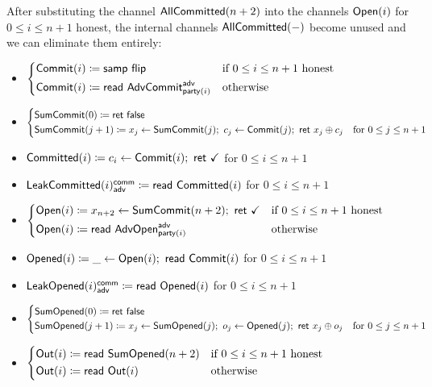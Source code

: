 \noindent After substituting the channel $\mathsf{AllCommitted}(n+2)$ into the channels $\mathsf{Open}(i)$ for $0 \leq i \leq n+1$ honest, the internal channels $\mathsf{AllCommitted}(-)$ become unused and we can eliminate them entirely:

\begin{itemize}
\item {\color{blue} $\begin{cases*} \Commit(i) \coloneqq \samp{\flip} & \text{if $0 \leq i \leq n+1$ honest} \\ \Commit(i) \coloneqq \read{\AdvCommit^\adv_{\party(i)}} & \text{otherwise} \end{cases*}$}
\item {\color{blue} $\begin{cases*} \SumCommit(0) \coloneqq \ret{\false} & \\ \SumCommit(j+1) \coloneqq x_j \leftarrow \SumCommit(j); \ c_j \leftarrow \Commit(j); \ \ret{x_j \oplus c_j} & \text{for $0 \leq j \leq n+1$} \end{cases*}$}
\item {\color{magenta} $\mathsf{Committed}(i) \coloneqq c_i \leftarrow \mathsf{Commit}(i); \ \mathsf{ret} \ \checkmark$ for $0 \leq i \leq n+1$}
\item {\color{magenta} $\mathsf{LeakCommitted}(i)^{\mathsf{comm}}_{\mathsf{adv}} \coloneqq \mathsf{read} \ \mathsf{Committed}(i)$ for $0 \leq i \leq n+1$}
\item {\color{teal} $\begin{cases*} \Open(i) \coloneqq x_{n+2} \leftarrow \SumCommit(n+2); \ \ret{\checkmark} & \text{if $0 \leq i \leq n+1$ honest} \\ \Open(i) \coloneqq \read{\AdvOpen^\adv_{\party(i)}} & \text{otherwise} \end{cases*}$}
\item {\color{red} $\mathsf{Opened}(i) \coloneqq \_ \leftarrow \mathsf{Open}(i); \ \mathsf{read} \ \mathsf{Commit}(i)$ for $0 \leq i \leq n+1$}
\item {\color{red} $\mathsf{LeakOpened}(i)^{\mathsf{comm}}_{\mathsf{adv}} \coloneqq \mathsf{read} \ \mathsf{Opened}(i)$ for $0 \leq i \leq n+1$}
\item {\color{red} $\begin{cases*} \SumOpened(0) \coloneqq \ret{\false} & \\ \SumOpened(j+1) \coloneqq x_j \leftarrow \SumOpened(j); \ o_j \leftarrow \Opened(j); \ \ret{x_j \oplus o_j} & \text{for $0 \leq j \leq n+1$} \end{cases*}$}
\item $\begin{cases*} \Out(i) \coloneqq \read{\SumOpened(n+2)} & \text{if $0 \leq i \leq n+1$ honest} \\ \Out(i) \coloneqq \read{\Out(i)} & \text{otherwise} \end{cases*}$
\end{itemize}

